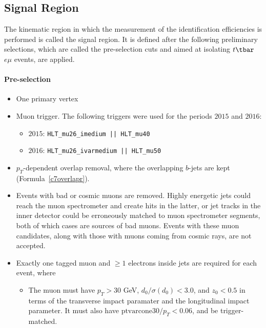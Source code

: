 \subsection{Signal Region}\label{ss:eidsr}

The kinematic region in which the measurement of the identification
efficiencies is performed is called the signal region. It is defined after the
following preliminary selections, which are called the pre-selection cuts and
aimed at isolating $t\tbar$ $e\mu$ events, are applied.

\paragraph{Pre-selection}

\begin{itemize}
	\item One primary vertex

	\item Muon trigger. The following triggers were used for the periods $2015$
	      and $2016$:

	      \begin{itemize}
		      \item $2015$: \texttt{HLT_mu26_imedium || HLT_mu40}
		      \item $2016$:  \texttt{HLT_mu26_ivarmedium || HLT_mu50}
	      \end{itemize}

	\item $p_T$-dependent overlap removal, where the overlapping $b$-jets are kept
	      (Formula~\ref{c7overlapr}).

	\item Events with bad or cosmic muons are removed. Highly energetic jets could
	      reach the muon spectrometer and create hits in the latter, or jet tracks in the
	      inner detector could be erroneously matched to muon spectrometer segments, both
	      of which cases are sources of bad muons. Events with these muon candidates,
	      along with those with muons coming from cosmic rays, are not accepted.

	\item Exactly one tagged muon and $\geq 1$ electrons inside jets are required
	      for each event, where

	      \begin{itemize}

		      \item The muon must have $p_T > 30$ GeV, $d_0 / \sigma(d_0) < 3.0$, and
		            $z_0 < 0.5$ in terms of the transverse impact paramater and the longitudinal
		            impact parameter. It must also have $\text{ptvarcone}30 / p_T < 0.06$, and be
		            trigger-matched.


\end{itemize}
\end{itemize}
